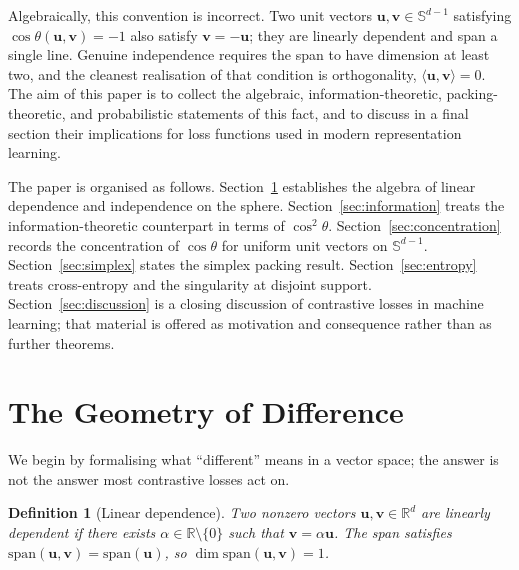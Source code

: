 \documentclass[11pt,a4paper]{article}
\newtheorem{definition}[theorem]{Definition}
\theoremstyle{remark}
\begin{document}
Algebraically, this convention is incorrect.
Two unit vectors $\mathbf{u}, \mathbf{v} \in \mathbb{S}^{d-1}$ satisfying $\cos\theta(\mathbf{u}, \mathbf{v}) = -1$ also satisfy $\mathbf{v} = -\mathbf{u}$; they are linearly dependent and span a single line.
Genuine independence requires the span to have dimension at least two, and the cleanest realisation of that condition is orthogonality, $\langle\mathbf{u}, \mathbf{v}\rangle = 0$.
The aim of this paper is to collect the algebraic, information-theoretic, packing-theoretic, and probabilistic statements of this fact, and to discuss in a final section their implications for loss functions used in modern representation learning.

The paper is organised as follows.
Section~\ref{sec:geometry} establishes the algebra of linear dependence and independence on the sphere.
Section~\ref{sec:information} treats the information-theoretic counterpart in terms of $\cos^2\theta$.
Section~\ref{sec:concentration} records the concentration of $\cos\theta$ for uniform unit vectors on $\mathbb{S}^{d-1}$.
Section~\ref{sec:simplex} states the simplex packing result.
Section~\ref{sec:entropy} treats cross-entropy and the singularity at disjoint support.
Section~\ref{sec:discussion} is a closing discussion of contrastive losses in machine learning; that material is offered as motivation and consequence rather than as further theorems.


\section{The Geometry of Difference}
\label{sec:geometry}

We begin by formalising what ``different'' means in a vector space; the answer is not the answer most contrastive losses act on.

\begin{definition}[Linear dependence]
\label{def:lindep}
Two nonzero vectors $\mathbf{u}, \mathbf{v} \in \mathbb{R}^d$ are \emph{linearly dependent} if there exists $\alpha \in \mathbb{R} \setminus \{0\}$ such that $\mathbf{v} = \alpha \mathbf{u}$.
The span satisfies $\mathrm{span}(\mathbf{u}, \mathbf{v}) = \mathrm{span}(\mathbf{u})$, so $\dim \mathrm{span}(\mathbf{u}, \mathbf{v}) = 1$.
\end{definition}
\end{document}
